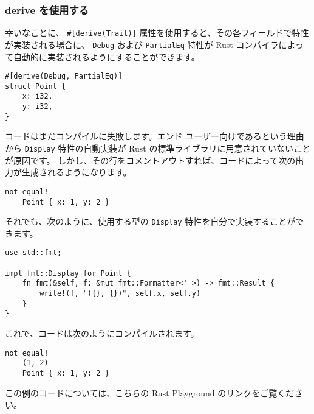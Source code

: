 \subsubsection{derive を使用する}

幸いなことに、 \texttt{\#[derive(Trait)]} 属性を使用すると、その各フィールドで特性が実装される場合に、 \texttt{Debug} および \texttt{PartialEq} 特性が Rust コンパイラによって自動的に実装されるようにすることができます。

\begin{lstlisting}[numbers=none]
#[derive(Debug, PartialEq)]
struct Point {
    x: i32,
    y: i32,
}
\end{lstlisting}

コードはまだコンパイルに失敗します。エンド ユーザー向けであるという理由から \texttt{Display} 特性の自動実装が Rust の標準ライブラリに用意されていないことが原因です。 しかし、その行をコメントアウトすれば、コードによって次の出力が生成されるようになります。

\begin{lstlisting}[numbers=none]
    not equal!
    Point { x: 1, y: 2 }
\end{lstlisting}

それでも、次のように、使用する型の \texttt{Display} 特性を自分で実装することができます。

\begin{lstlisting}[numbers=none]
use std::fmt;

impl fmt::Display for Point {
    fn fmt(&self, f: &mut fmt::Formatter<'_>) -> fmt::Result {
        write!(f, "({}, {})", self.x, self.y)
    }
}
\end{lstlisting}

これで、コードは次のようにコンパイルされます。

\begin{lstlisting}[numbers=none]
    not equal!
    (1, 2)
    Point { x: 1, y: 2 }
\end{lstlisting}

この例のコードについては、こちらの Rust Playground のリンクをご覧ください。

